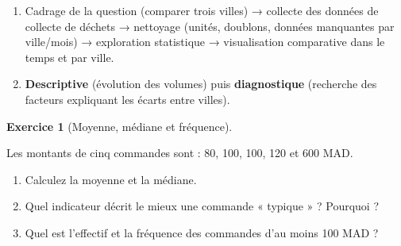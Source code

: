 \documentclass[
  french,
  letterpaper,
  open=any]{scrbook}
\providecommand{\tightlist}{%
  \setlength{\itemsep}{0pt}\setlength{\parskip}{0pt}}
\theoremstyle{definition}
\theoremstyle{definition}
\newtheorem{exercise}{Exercice}[section]
\theoremstyle{remark}
\begin{document}
\begin{tcolorbox}[enhanced jigsaw, arc=.35mm, bottomrule=.15mm, bottomtitle=1mm, breakable, colback=white, colbacktitle=quarto-callout-tip-color!10!white, colframe=quarto-callout-tip-color-frame, coltitle=black, left=2mm, leftrule=.75mm, opacityback=0, opacitybacktitle=0.6, rightrule=.15mm, title=\textcolor{quarto-callout-tip-color}{\faLightbulb}\hspace{0.5em}{Solution de l'exercice Exercice~\ref{exr-intro-ad-3}}, titlerule=0mm, toprule=.15mm, toptitle=1mm]

\begin{enumerate}
\def\labelenumi{\alph{enumi}.}
\tightlist
\item
  Cadrage de la question (comparer trois villes) → collecte des données
  de collecte de déchets → nettoyage (unités, doublons, données
  manquantes par ville/mois) → exploration statistique → visualisation
  comparative dans le temps et par ville.
\item
  \textbf{Descriptive} (évolution des volumes) puis
  \textbf{diagnostique} (recherche des facteurs expliquant les écarts
  entre villes).
\end{enumerate}

\end{tcolorbox}

\begin{exercise}[Moyenne, médiane et
fréquence]\protect\hypertarget{exr-intro-ad-4}{}\label{exr-intro-ad-4}

Les montants de cinq commandes sont : 80, 100, 100, 120 et 600 MAD.

\begin{enumerate}
\def\labelenumi{\alph{enumi}.}
\tightlist
\item
  Calculez la moyenne et la médiane.
\item
  Quel indicateur décrit le mieux une commande « typique » ? Pourquoi ?
\item
  Quel est l'effectif et la fréquence des commandes d'au moins 100 MAD ?
\end{enumerate}

\end{exercise}
\end{document}
